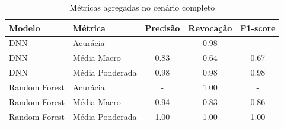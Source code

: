 \begin{table}[H]
  \centering
  \small
  \label{tab:metricas_completo}
  \begin{tabular}{llccc}
    \hline
    \textbf{Modelo} & \textbf{Métrica} & \textbf{Precisão} & \textbf{Revocação} & \textbf{F1-score} \\
    \hline
    DNN             & Acurácia         & -                 & 0.98               & -                 \\
    DNN             & Média Macro      & 0.83              & 0.64               & 0.67              \\
    DNN             & Média Ponderada  & 0.98              & 0.98               & 0.98              \\
    \hline
    Random Forest   & Acurácia         & -                 & 1.00               & -                 \\
    Random Forest   & Média Macro      & 0.94              & 0.83               & 0.86              \\
    Random Forest   & Média Ponderada  & 1.00              & 1.00               & 1.00              \\
    \hline
  \end{tabular}
  \caption{Métricas agregadas no cenário completo}
\end{table}
